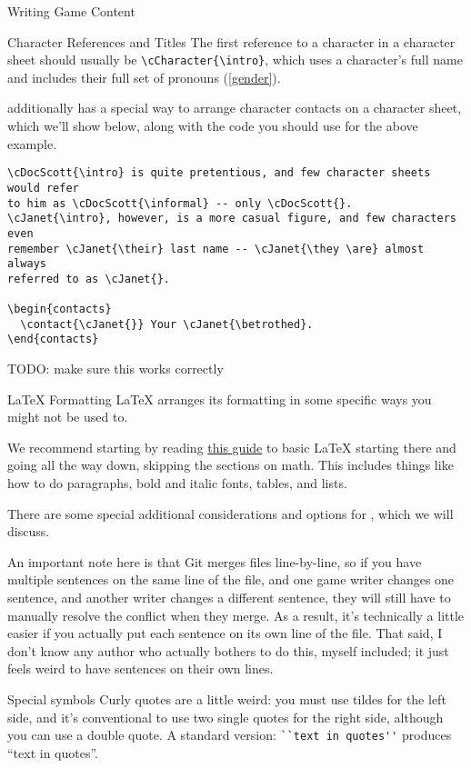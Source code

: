 \documentclass[sheet]{GameTexBase}
\begin{document}
\begin{section}{Writing Game Content}
\begin{subsection}{Character References and Titles}
The first reference to a character in a character sheet should usually be \lstinline|\cCharacter{\intro}|, which uses a character's full name and includes their full set of pronouns (\ref{gender}).

\gametex{} additionally has a special way to arrange character contacts on a character sheet, which we'll show below, along with the \gametex{} code you should use for the above example.
\begin{verbatim}
\cDocScott{\intro} is quite pretentious, and few character sheets would refer
to him as \cDocScott{\informal} -- only \cDocScott{}.  
\cJanet{\intro}, however, is a more casual figure, and few characters even
remember \cJanet{\their} last name -- \cJanet{\they \are} almost always
referred to as \cJanet{}.

\begin{contacts}
  \contact{\cJanet{}} Your \cJanet{\betrothed}.
\end{contacts}
\end{verbatim}

TODO: make sure this works correctly
\end{subsection}
\begin{subsection}{\LaTeX{} Formatting}
LaTeX arranges its formatting in some specific ways you might not be used to.

We recommend starting by reading \href{https://www.overleaf.com/learn/latex/Learn_LaTeX_in_30_minutes#Adding_comments}{this guide} to basic \LaTeX{} starting there and going all the way down, skipping the sections on math.
This includes things like how to do paragraphs, bold and italic fonts, tables, and lists.

There are some special additional considerations and options for \gametex{}, which we will discuss.

An important note here is that Git merges files line-by-line, so if you have multiple sentences on the same line of the file, and one game writer changes one sentence, and another writer changes a different sentence, they will still have to manually resolve the conflict when they merge.  As a result, it's technically a little easier if you actually put each sentence on its own line of the file.  That said, I don't know any author who actually bothers to do this, myself included; it just feels weird to have sentences on their own lines.

\begin{subsubsection}{Special symbols}
Curly quotes are a little weird: you must use tildes for the left side, and it's conventional to use two single quotes for the right side, although you can use a double quote.  A standard version: \lstinline{``text in quotes''} produces ``text in quotes''.


\end{subsubsection}
\end{subsection}
\end{section}
\end{document}

